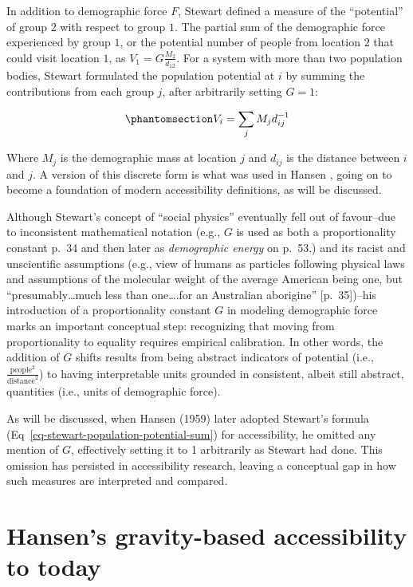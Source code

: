 \documentclass[
  10pt,
  letterpaper,
]{article}
\begin{document}
In addition to demographic force \(F\), Stewart defined a measure of the
``potential'' of group \(2\) with respect to group \(1\). The partial
sum of the demographic force experienced by group \(1\), or the
potential number of people from location \(2\) that could visit location
\(1\), as \(V_1 = G\frac{M_2}{d_{12}}\). For a system with more than two
population bodies, Stewart formulated the population potential at \(i\)
by summing the contributions from each group \(j\), after arbitrarily
setting \(G=1\):

\begin{equation}\phantomsection\label{eq-stewart-population-potential-sum}{
V_i = \sum_j M_jd_{ij}^{-1}
}\end{equation}

\noindent Where \(M_j\) is the demographic mass at location \(j\) and
\(d_{ij}\) is the distance between \(i\) and \(j\). A version of this
discrete form is what was used in Hansen \citep{hansen1959}, going on to
become a foundation of modern accessibility definitions, as will be
discussed.

Although Stewart's concept of ``social physics'' eventually fell out of
favour--due to inconsistent mathematical notation (e.g., \(G\) is used
as both a proportionality constant p.~34 and then later as
\emph{demographic energy} on p.~53.) and its racist and unscientific
assumptions (e.g., view of humans as particles following physical laws
and assumptions of the molecular weight of the average American being
one, but ``presumably\ldots much less than one\ldots.for an Australian
aborigine'' {[}p.~35{]})--his introduction of a proportionality constant
\(G\) in modeling demographic force marks an important conceptual step:
recognizing that moving from proportionality to equality requires
empirical calibration. In other words, the addition of \(G\) shifts
results from being abstract indicators of potential (i.e.,
\(\frac{\text{people}^2}{\text{distance}^{2}}\)) to having interpretable
units grounded in consistent, albeit still abstract, quantities (i.e.,
units of demographic force).

As will be discussed, when Hansen (1959) \citep{hansen1959} later
adopted Stewart's formula (Eq~\ref{eq-stewart-population-potential-sum})
for accessibility, he omitted any mention of \(G\), effectively setting
it to 1 arbitrarily as Stewart had done. This omission has persisted in
accessibility research, leaving a conceptual gap in how such measures
are interpreted and compared.

\section{Hansen's gravity-based accessibility to
today}\label{grav-to-today}
\end{document}
